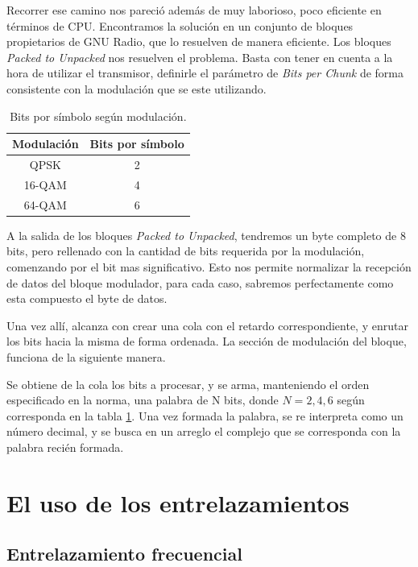 Recorrer ese camino nos pareció además de muy laborioso, poco eficiente en términos de CPU. Encontramos la solución en un conjunto de bloques propietarios de GNU Radio, que lo resuelven de manera eficiente. Los bloques \textit{Packed to Unpacked} nos resuelven el problema. Basta con tener en cuenta a la hora de utilizar el transmisor, definirle el parámetro de \textit{Bits per Chunk} de forma consistente con la modulación que se este utilizando. 

\begin{table}[h!]
	\centering
	\begin{tabular}{|c|c|}
		\hline
		\textbf{Modulación} & \textbf{Bits por símbolo}\\
		\hline
		QPSK		& 2\\
		\hline
		16-QAM 		& 4\\
		\hline
		64-QAM		& 6\\
		\hline
	\end{tabular}
	\caption{\label{Bits por simbolo segun modulacion} Bits por símbolo según modulación.}
\end{table}

A la salida de los bloques \textit{Packed to Unpacked}, tendremos un byte completo de 8 bits, pero rellenado con la cantidad de bits requerida por la modulación, comenzando por el bit mas significativo.  Esto nos permite normalizar la recepción de datos del bloque modulador, para cada caso, sabremos perfectamente como esta compuesto el byte de datos. 

Una vez allí, alcanza con crear una cola con el retardo correspondiente, y enrutar los bits hacia la misma de forma ordenada. La sección de modulación del bloque, funciona de la siguiente manera. 

Se obtiene de la cola los bits a procesar, y se arma, manteniendo el orden especificado en la norma, una palabra de N bits, donde $N={2,4,6}$ según corresponda en la tabla \ref{Bits por simbolo segun modulacion}. Una vez formada la palabra, se re interpreta como un número decimal, y se busca en un arreglo el complejo que se corresponda con la palabra recién formada.

\section{El uso de los entrelazamientos}

\subsection{Entrelazamiento frecuencial}

